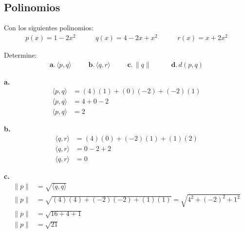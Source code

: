 \documentclass{article}
\begin{document}
        \subsection{Polinomios}

            Con los siguientes polinomios:
            \begin{gather*}
                p(x)=1-2x^{2}\hspace{35pt}q(x)=4-2x+x^{2}\hspace{35pt}r(x)=x+2x^{2}
            \end{gather*}

            Determine:
            \begin{gather*}
                \textbf{a.}\hspace{2pt}\langle p,q\rangle\hspace{30pt}\textbf{b.}\hspace{2pt}\langle q,r\rangle\hspace{30pt}\textbf{c.}\hspace{2pt}\parallel q\parallel\hspace{35pt}\textbf{d.}\hspace{2pt}d(p,q)
            \end{gather*}

            \textbf{a.}
                \begin{align*}
                    \langle p,q\rangle&= (4)(1)+(0)(-2)+(-2)(1) \\
                    \langle p,q\rangle&= 4+0-2 \\
                    \langle p,q\rangle&= 2 
                \end{align*}

            \textbf{b.}
                \begin{align*}
                    \langle q,r\rangle&= (4)(0)+(-2)(1)+(1)(2)\\
                    \langle q,r\rangle&= 0-2+2\\
                    \langle q,r\rangle&= 0
                \end{align*}

            \textbf{c.}
                \begin{align*}
                    \parallel p\parallel&= \sqrt{\langle q,q\rangle} \\
                    \parallel p\parallel&= \sqrt{(4)(4)+(-2)(-2)+(1)(1)}=\sqrt{4^{2}+(-2)^{2}+1^{2}} \\
                    \parallel p\parallel&= \sqrt{16+4+1} \\
                    \parallel p\parallel&= \sqrt{21}
                \end{align*}
\end{document}
